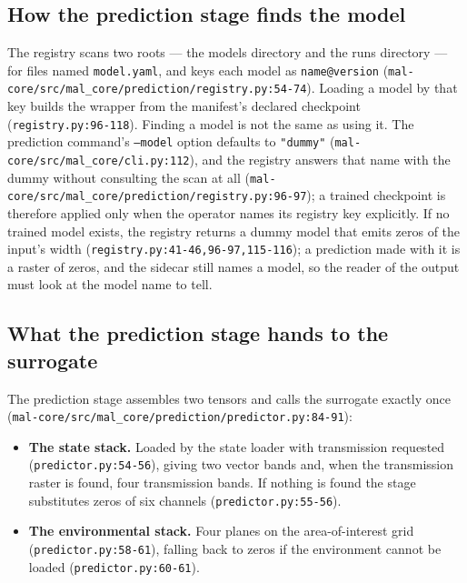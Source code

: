 \documentclass[11pt,a4paper]{article}
\newcommand{\codex}[1]{\texttt{#1}}
\begin{document}
\subsection{How the prediction stage finds the model}

The registry scans two roots --- the models directory and the runs directory
--- for files named \codex{model.yaml}, and keys each model as
\codex{name@version}
(\codex{mal-core/\allowbreak{}src/\allowbreak{}mal\_\allowbreak{}core/\allowbreak{}prediction/\allowbreak{}registry.py:54-74}). Loading a model
by that key builds the wrapper from the manifest's declared checkpoint
(\codex{registry.py:96-118}). Finding a model is not the same as using it. The prediction command's
\codex{--model} option defaults to \codex{"dummy"}
(\codex{mal-core/\allowbreak{}src/\allowbreak{}mal\_\allowbreak{}core/\allowbreak{}cli.py:112}), and the registry answers
that name with the dummy without consulting the scan at all
(\codex{mal-core/\allowbreak{}src/\allowbreak{}mal\_\allowbreak{}core/\allowbreak{}prediction/\allowbreak{}registry.py:96-97}); a trained checkpoint is
therefore applied only when the operator names its registry key explicitly.
If no trained model exists, the registry
returns a dummy model that emits zeros of the input's width
(\codex{registry.py:41-46,96-97,115-116}); a prediction made with it is a raster of
zeros, and the sidecar still names a model, so the reader of the output must
look at the model name to tell.

\subsection{What the prediction stage hands to the surrogate}

The prediction stage assembles two tensors and calls the surrogate exactly
once (\codex{mal-core/\allowbreak{}src/\allowbreak{}mal\_\allowbreak{}core/\allowbreak{}prediction/\allowbreak{}predictor.py:84-91}):

\begin{itemize}
\item \textbf{The state stack.} Loaded by the state loader with transmission
      requested (\codex{predictor.py:54-56}), giving two vector bands and,
      when the transmission raster is found, four transmission bands. If
      nothing is found the stage substitutes zeros of six channels
      (\codex{predictor.py:55-56}).
\item \textbf{The environmental stack.} Four planes on the area-of-interest
      grid (\codex{predictor.py:58-61}), falling back to zeros if the
      environment cannot be loaded (\codex{predictor.py:60-61}).
\end{itemize}
\end{document}
